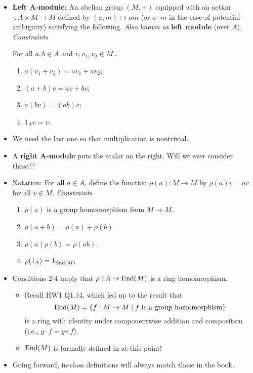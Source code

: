 \documentclass[../notes.tex]{subfiles}
\begin{document}
\begin{itemize}
\begin{itemize}
    \end{itemize}
    \item \textbf{Left $\bm{A}$-module}: An abelian group $(M,+)$ equipped with an action $\cdot:A\times M\to M$ defined by $(a,m)\mapsto am$ (or $a\cdot m$ in the case of potential ambiguity) satisfying the following. \emph{Also known as} \textbf{left module} (over $A$). \emph{Constraints}\par
    For all $a,b\in A$ and $v,v_1,v_2\in M$\dots
    \begin{enumerate}[label={(\arabic*)}]
        \item $a(v_1+v_2)=av_1+av_2$;
        \item $(a+b)v=av+bv$;
        \item $a(bv)=(ab)v$;
        \item $1_Av=v$.
    \end{enumerate}
    \item We need the last one so that multiplication is nontrivial.
    \item A \textbf{right $\bm{A}$-module} puts the scalar on the right. Will we ever consider these??
    \item Notation: For all $a\in A$, define the function $\rho(a):M\to M$ by $\rho(a)v=av$ for all $v\in M$. \emph{Constraints}
    \begin{enumerate}[label={(\arabic*)}]
        \item $\rho(a)$ is a group homomorphism from $M\to M$.
        \item $\rho(a+b)=\rho(a)+\rho(b)$.
        \item $\rho(a)\rho(b)=\rho(ab)$.
        \item $\rho(1_A)=1_{\operatorname{End}(M)}$
    \end{enumerate}
    \item Conditions 2-4 imply that $\rho:A\to\operatorname{End}(M)$ is a ring homomorphism.
    \begin{itemize}
        \item Recall HW1 Q1.14, which led up to the result that
        \begin{equation*}
            \operatorname{End}(M) = \{f:M\to M\mid f\text{ is a group homomorphism}\}
        \end{equation*}
        is a ring with identity under componentwise addition and composition (i.e., $g\cdot f=g\circ f$).
        \item $\operatorname{End}(M)$ is formally defined in \textcite{bib:DummitFoote} at this point!
    \end{itemize}
    \item Going forward, in-class definitions will always match those in the book.

\end{itemize}
\end{document}
